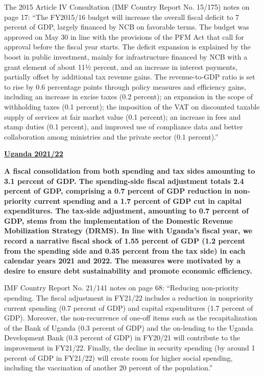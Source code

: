 The 2015 Article IV Consultation (IMF Country Report No. 15/175) notes on page 17: “The FY2015/16 budget will increase the overall fiscal deficit to 7 percent of GDP, largely financed by NCB on favorable terms. The budget was approved on May 30 in line with the provisions of the PFM Act that call for approval before the fiscal year starts. The deficit expansion is explained by the boost in public investment, mainly for infrastructure financed by NCB with a grant element of about 11½ percent, and an increase in interest payments, partially offset by additional tax revenue gains. The revenue-to-GDP ratio is set to rise by 0.6 percentage points through policy measures and efficiency gains, including an increase in excise taxes (0.2 percent); an expansion in the scope of withholding taxes (0.1 percent); the imposition of the VAT on discounted taxable supply of services at fair market value (0.1 percent); an increase in fees and stamp duties (0.1 percent), and improved use of compliance data and better collaboration among ministries and the private sector (0.1 percent).”

\textbf{\underline{Uganda 2021/22}}

\textbf{A fiscal consolidation from both spending and tax sides amounting to 3.1 percent of GDP. The spending-side fiscal adjustment totals 2.4 percent of GDP, comprising a 0.7 percent of GDP reduction in non-priority current spending and a 1.7 percent of GDP cut in capital expenditures. The tax-side adjustment, amounting to 0.7 percent of GDP, stems from the implementation of the Domestic Revenue Mobilization Strategy (DRMS). In line with Uganda’s fiscal year, we record a narrative fiscal shock of 1.55 percent of GDP (1.2 percent from the spending side and 0.35 percent from the tax side) in each calendar years 2021 and 2022. The measures were motivated by a desire to ensure debt sustainability and promote economic efficiency.}

IMF Country Report No. 21/141 notes on page 68: “Reducing non-priority spending. The fiscal adjustment in FY21/22 includes a reduction in nonpriority current spending (0.7 percent of GDP) and capital expenditures (1.7 percent of GDP). Moreover, the non-recurrence of one-off items such as the recapitalization of the Bank of Uganda (0.3 percent of GDP) and the on-lending to the Uganda Development Bank (0.3 percent of GDP) in FY20/21 will contribute to the improvement in FY21/22. Finally, the decline in security spending (by around 1 percent of GDP in FY21/22) will create room for higher social spending, including the vaccination of another 20 percent of the population.”


